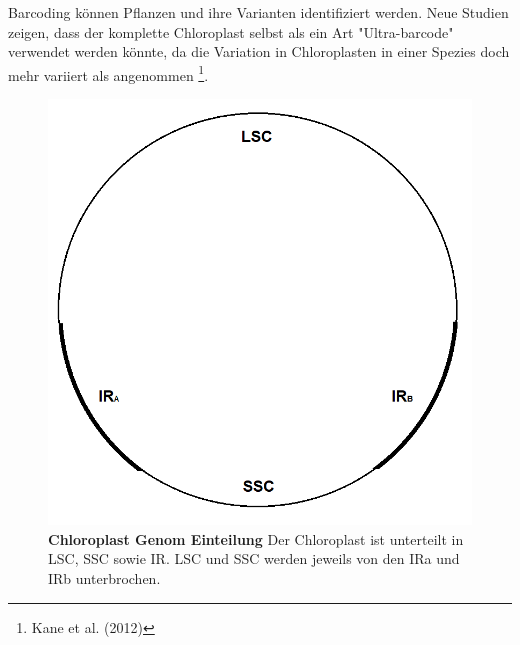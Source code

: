 \documentclass{scrartcl}
\begin{document}
Barcoding können Pflanzen und ihre Varianten identifiziert werden. Neue Studien zeigen, dass der komplette Chloroplast selbst als ein Art "Ultra-barcode"
verwendet werden könnte, da die Variation in Chloroplasten in einer Spezies doch mehr variiert als angenommen \footnote{Kane et al. (2012)}. 
\begin{figure}
\includegraphics[width=.9\linewidth]{./Chloroplast.png}
\caption[Chloroplast Genom Einteilung]{\textbf{Chloroplast Genom Einteilung} Der Chloroplast ist unterteilt in LSC, SSC sowie IR. LSC und SSC werden jeweils von den IRa und IRb unterbrochen.}
\end{figure}
\end{document}
